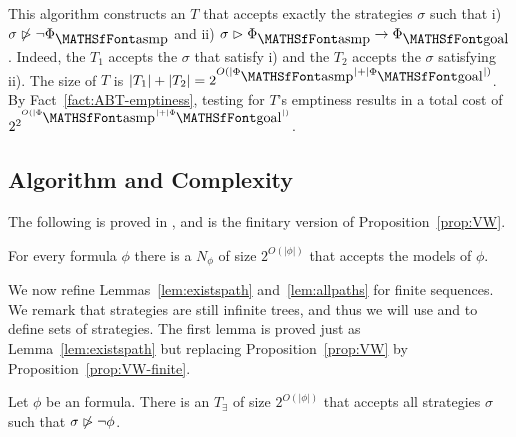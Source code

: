 This algorithm constructs an \ABT $T$ that accepts exactly the strategies $\sigma$ such that i) $\sigma \not \sat \neg \formula{\asmp}$ and ii) $\sigma \sat \formula{\asmp} \limp \formula{\goal}$. Indeed, the \NBT $T_1$ accepts the $\sigma$ that satisfy i) and the \UCT $T_2$ accepts the $\sigma$ satisfying ii). 
The size of $T$ is $|T_1| + |T_2|  = 2^{O(|\formula{\asmp}| + |\formula{\goal}|)}$. By Fact~\ref{fact:ABT-emptiness}, testing for $T$'s emptiness results in a total cost of $2^{2^{O(|\formula{\asmp}| + |\formula{\goal}|)}}$.





\subsection{Algorithm and Complexity}

The following is proved in \cite{DBLP:conf/ijcai/GiacomoV15}, and is the finitary version of Proposition~\ref{prop:VW}.
\begin{proposition} \label{prop:VW-finite} 
For every \LTLf formula $\phi$ there is a \NFWf $N_\phi$ of size $2^{O(|\phi|)}$ that accepts the models of $\phi$.
\end{proposition}



We now refine Lemmas~\ref{lem:existspath} and~\ref{lem:allpaths} for finite sequences. We remark that strategies are still infinite trees, 
and thus we will use \NFT and \DFT to define sets of strategies. The first lemma is proved just as Lemma~\ref{lem:existspath} but replacing Proposition~\ref{prop:VW} by Proposition~\ref{prop:VW-finite}.

\begin{lemma} \label{lem:existspath-finite}
Let $\phi$ be an \LTLf formula. 
There is an \NFT $T_\exists$ of size $2^{O(|\phi|)}$ that accepts all strategies $\sigma$ such that $\sigma \not \vartriangleright \neg \phi$. 
\end{lemma}


